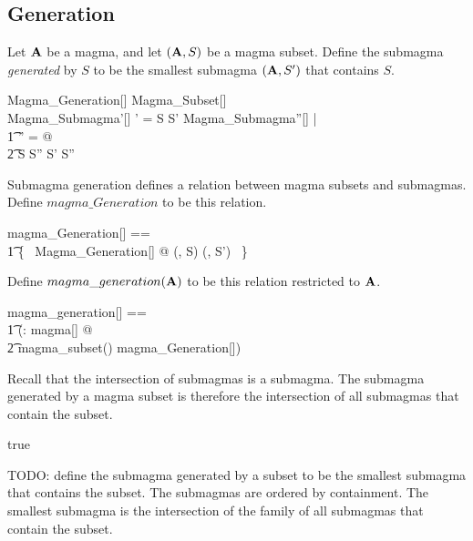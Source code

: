 \documentclass{amsart}
\begin{document}
\subsection{Generation}

Let $\mathbf{A}$ be a magma, and let $(\mathbf{A}, S)$ be a magma subset.
Define the submagma \textit{generated} by $S$ to be the smallest submagma $(\mathbf{A}, S')$
that contains $S$.

\begin{schema}{Magma\_Generation}[\genT]
	Magma\_Subset[\genT] \\
	Magma\_Submagma'[\genT]
\where
	\strucA' = \strucA
\also
	S \subseteq S'
\also
	\forall Magma\_Submagma''[\genT] | \\
	\t1	\strucA'' = \strucA @ \\
	\t2		S \subseteq S'' \implies S' \subseteq S''
\end{schema}

Submagma generation defines a relation between magma subsets and submagmas.
Define $magma\_Generation$ to be this relation.

\begin{zed}
	magma\_Generation[\genT] == \\
	\t1	\{~ Magma\_Generation[\genT] @ (\strucA, S) \mapsto (\strucA, S') ~\}
\end{zed}

Define $magma\_generation(\mathbf{A})$ to be this relation restricted to $\mathbf{A}$.

\begin{zed}
	magma\_generation[\genT] == \\
	\t1	(\lambda \strucA: magma[\genT] @ \\
	\t2		magma\_subset(\strucA) \dres magma\_Generation[\genT])
\end{zed}

\begin{remark}
Recall that the intersection of submagmas is a submagma.
The submagma generated by a magma subset is therefore the intersection of 
all submagmas that contain the subset.

\begin{zed}
	true
\end{zed}

\end{remark}

TODO: define the submagma generated by a subset to be the smallest submagma that
contains the subset. The submagmas are ordered by containment.
The smallest submagma is the intersection of the family of all submagmas that contain the subset.
\end{document}
